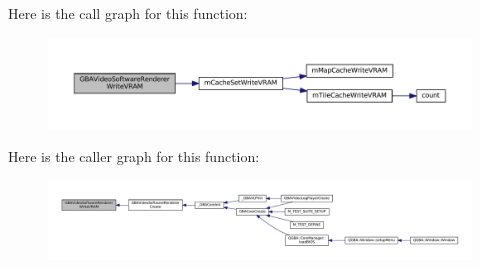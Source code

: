 Here is the call graph for this function\+:
\nopagebreak
\begin{figure}[H]
\begin{center}
\leavevmode
\includegraphics[width=350pt]{video-software_8c_aa5af01915ee7706cdbf55fd4295192f6_cgraph}
\end{center}
\end{figure}
Here is the caller graph for this function\+:
\nopagebreak
\begin{figure}[H]
\begin{center}
\leavevmode
\includegraphics[width=350pt]{video-software_8c_aa5af01915ee7706cdbf55fd4295192f6_icgraph}
\end{center}
\end{figure}
